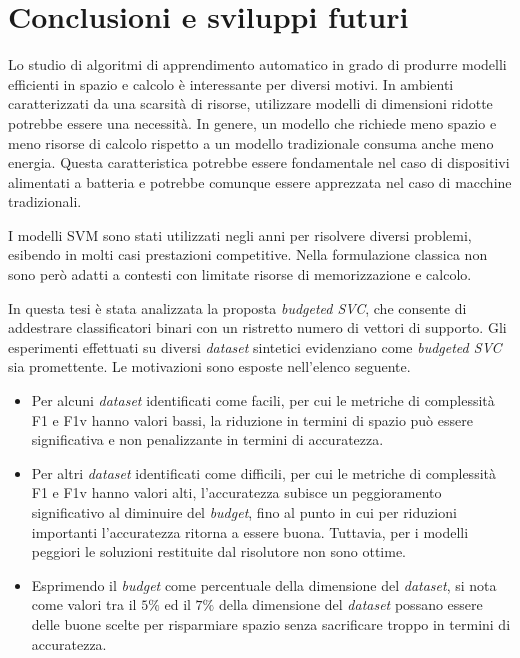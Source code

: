 \chapter{Conclusioni e sviluppi futuri}
\label{chap:conclusioni}
Lo studio di algoritmi di apprendimento automatico in grado di produrre modelli efficienti in spazio e calcolo è interessante per diversi motivi. 
In ambienti caratterizzati da una scarsità di risorse, utilizzare modelli di dimensioni ridotte potrebbe essere una necessità.
In genere, un modello che richiede meno spazio e meno risorse di calcolo rispetto a un modello tradizionale consuma anche meno energia. Questa caratteristica potrebbe essere fondamentale nel caso di dispositivi alimentati a batteria e potrebbe comunque essere apprezzata nel caso di macchine tradizionali. 

I modelli SVM sono stati utilizzati negli anni per risolvere diversi problemi, esibendo in molti casi prestazioni competitive. Nella formulazione classica non sono però adatti a contesti con limitate risorse di memorizzazione e calcolo.

In questa tesi è stata analizzata la proposta \emph{budgeted SVC}, che consente di addestrare classificatori binari con un ristretto numero di vettori di supporto.
Gli esperimenti effettuati su diversi \emph{dataset} sintetici evidenziano come \emph{budgeted SVC} sia promettente. 
Le motivazioni sono esposte nell'elenco seguente.
\begin{itemize}
    \item Per alcuni \emph{dataset} identificati come facili, per cui le metriche di complessità F1 e F1v hanno valori bassi, la riduzione in termini di spazio può essere significativa e non penalizzante in termini di accuratezza.
    \item Per altri \emph{dataset} identificati come difficili, per cui le metriche di complessità F1 e F1v hanno valori alti, l'accuratezza subisce un peggioramento significativo al diminuire del \emph{budget}, fino al punto in cui per riduzioni importanti l'accuratezza ritorna a essere buona. Tuttavia, per i modelli peggiori le soluzioni restituite dal risolutore non sono ottime.
    \item Esprimendo il \emph{budget} come percentuale della dimensione del \emph{dataset}, si nota come valori tra il $5\%$ ed il $7\%$ della dimensione del \emph{dataset} possano essere delle buone scelte per risparmiare spazio senza sacrificare troppo in termini di accuratezza.
\end{itemize}


